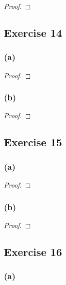 \documentclass[14pt]{extarticle}
\begin{document}
\begin{proof}

\end{proof}

\subsection{Exercise 14}

\subsubsection{(a)}

\begin{proof}

\end{proof}

\subsubsection{(b)}

\begin{proof}

\end{proof}

\subsection{Exercise 15}

\subsubsection{(a)}

\begin{proof}

\end{proof}

\subsubsection{(b)}

\begin{proof}

\end{proof}

\subsection{Exercise 16}

\subsubsection{(a)}
\end{document}
